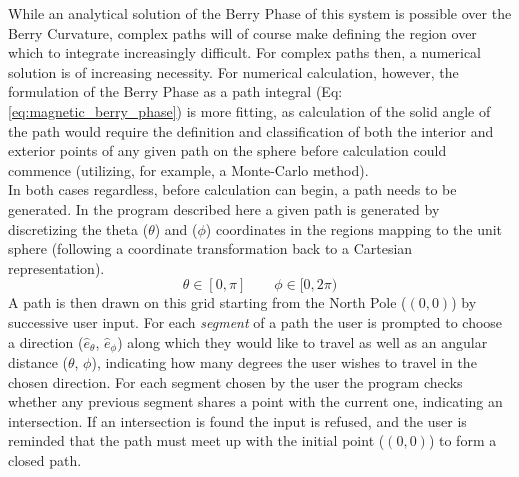 \documentclass{article}
\begin{document}
While an analytical solution of the Berry Phase of this system is possible over the Berry Curvature, complex paths will of course make defining the region over which to integrate increasingly difficult. For complex paths then, a numerical solution is of increasing necessity. For numerical calculation, however, the formulation of the Berry Phase as a path integral (Eq: \ref{eq:magnetic_berry_phase}) is more fitting, as calculation of the solid angle of the path would require the definition and classification of both the interior and exterior points of any given path on the sphere before calculation could commence (utilizing, for example, a Monte-Carlo method).\\

In both cases regardless, before calculation can begin, a path needs to be generated. In the program described here a given path is generated by discretizing the theta ($\theta$) and ($\phi$) coordinates in the regions mapping to the unit sphere (following a coordinate transformation back to a Cartesian representation).
\begin{equation*}
  \theta \in [0, \pi]  \qquad  \phi \in [0, 2\pi)
\end{equation*}
A path is then drawn on this grid starting from the North Pole ($(0,0)$) by successive user input. For each \textit{segment} of a path the user is prompted to choose a direction ($\hat{e}_{\theta}$, $\hat{e}_{\phi}$) along which they would like to travel as well as an angular distance ($\theta$, $\phi$), indicating how many degrees the user wishes to travel in the chosen direction. For each segment chosen by the user the program checks whether any previous segment shares a point with the current one, indicating an   intersection. If an intersection is found the input is refused, and the user is reminded that the path must meet up with the initial point ($(0,0)$) to form a closed path.\\
\end{document}
